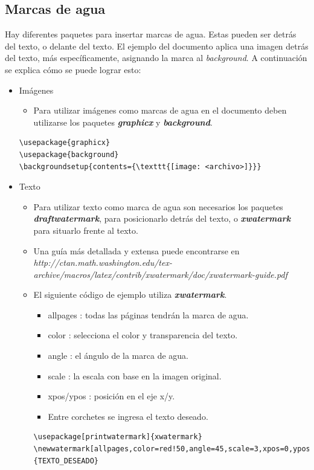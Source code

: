 \documentclass[10pt,journal,compsoc]{IEEEtran}
\begin{document}
	\subsection{Marcas de agua}
	Hay diferentes paquetes para insertar marcas de agua. Estas pueden ser detr\'as del texto, o delante del texto. El ejemplo del documento aplica una imagen detr\'as del texto, m\'as espec\'ificamente, asignando la marca al \emph{background}. A continuaci\'on se explica c\'omo se puede lograr esto:
	\begin{itemize}
		\item Im\'agenes
		\begin{itemize}
			\item Para utilizar im\'agenes como marcas de agua en el documento deben utilizarse los paquetes \textbf{\textit{graphicx}} y \textbf{\textit{background}}.	
		\end{itemize}
	\begin{lstlisting}
\usepackage{graphicx}
\usepackage{background}
\backgroundsetup{contents={\texttt{[image: <archivo>]}}}
	\end{lstlisting}
	\item Texto
		\begin{itemize}
			\item Para utilizar texto como marca de agua son necesarios los paquetes \textbf{\textit{draftwatermark}}, para posicionarlo detr\'as del texto, o \textbf{\textit{xwatermark}} para situarlo frente al texto.
			\item Una gu\'ia m\'as detallada y extensa puede encontrarse en \emph{http://ctan.math.washington.edu/tex-archive/macros/latex/contrib/xwatermark/doc/xwatermark-guide.pdf}
			\item El siguiente c\'odigo de ejemplo utiliza \textbf{\textit{xwatermark}}.
			\begin{itemize}
				\item allpages : todas las p\'aginas tendr\'an la marca de agua.
				\item color : selecciona el color y transparencia del texto.
				\item angle : el \'angulo de la marca de agua.
				\item scale : la escala con base en la imagen original.
				\item xpos/ypos : posici\'on en el eje x/y.
				\item Entre corchetes se ingresa el texto deseado.
			\end{itemize}	
			\begin{lstlisting}
\usepackage[printwatermark]{xwatermark}
\newwatermark[allpages,color=red!50,angle=45,scale=3,xpos=0,ypos=0]{TEXTO_DESEADO}
			\end{lstlisting}
		\end{itemize}
	\end{itemize}
\end{document}
